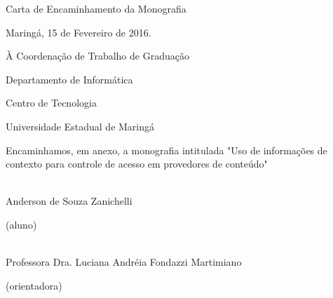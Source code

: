 
\vspace{5cm}
Carta de Encaminhamento da Monografia

\vspace{2cm}
\hfill Maringá, 15 de Fevereiro de 2016.

\vspace{3cm}
À Coordenação de Trabalho de Graduação

Departamento de Informática

Centro de Tecnologia

Universidade Estadual de Maringá

\vspace{3cm}
Encaminhamos, em anexo, a monografia intitulada "Uso de informações de contexto para controle de acesso em provedores de conteúdo"

\begin{center}
\vspace{3cm}

\makebox[3in]{\hrulefill}\\
Anderson de Souza Zanichelli

(aluno)

\vspace{3cm}
\makebox[3in]{\hrulefill}\\
Professora Dra. Luciana Andréia Fondazzi Martimiano

(orientadora)
\end{center}